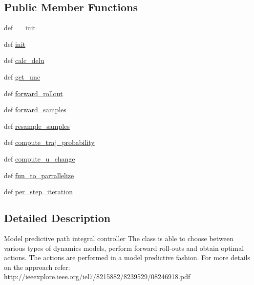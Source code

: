 \subsection*{Public Member Functions}
\begin{DoxyCompactItemize}
\item 
def \hyperlink{classaml__opt_1_1mppi__controller_1_1mppi__controller_1_1_m_p_p_i_controller_ae231c281d2731163b919cfae98526031}{\-\_\-\-\_\-init\-\_\-\-\_\-}
\item 
def \hyperlink{classaml__opt_1_1mppi__controller_1_1mppi__controller_1_1_m_p_p_i_controller_a22e2e4e882b6786cf5a206906d360a5a}{init}
\item 
def \hyperlink{classaml__opt_1_1mppi__controller_1_1mppi__controller_1_1_m_p_p_i_controller_a687ec79baf303a410b469148db9fd44f}{calc\-\_\-delu}
\item 
def \hyperlink{classaml__opt_1_1mppi__controller_1_1mppi__controller_1_1_m_p_p_i_controller_acb1e37b0e70f40de3d7924bc3423e670}{get\-\_\-unc}
\item 
def \hyperlink{classaml__opt_1_1mppi__controller_1_1mppi__controller_1_1_m_p_p_i_controller_a2b55b9ba153afbaa57a8b3785b367011}{forward\-\_\-rollout}
\item 
def \hyperlink{classaml__opt_1_1mppi__controller_1_1mppi__controller_1_1_m_p_p_i_controller_ab291469dfce2398f98b5812f25665f65}{forward\-\_\-samples}
\item 
def \hyperlink{classaml__opt_1_1mppi__controller_1_1mppi__controller_1_1_m_p_p_i_controller_a608122d185b4401ca17eb088c72c1a21}{resample\-\_\-samples}
\item 
def \hyperlink{classaml__opt_1_1mppi__controller_1_1mppi__controller_1_1_m_p_p_i_controller_aecd5cdce0c5364fbcf6ed890b3b1933e}{compute\-\_\-traj\-\_\-probability}
\item 
def \hyperlink{classaml__opt_1_1mppi__controller_1_1mppi__controller_1_1_m_p_p_i_controller_a213f5b0756b132c4e4253baa199cb061}{compute\-\_\-u\-\_\-change}
\item 
def \hyperlink{classaml__opt_1_1mppi__controller_1_1mppi__controller_1_1_m_p_p_i_controller_a689adb7d7d0e10cf9b40b52733c81c5b}{fun\-\_\-to\-\_\-parrallelize}
\item 
def \hyperlink{classaml__opt_1_1mppi__controller_1_1mppi__controller_1_1_m_p_p_i_controller_a04416a629f547bb3a888b479169afda9}{per\-\_\-step\-\_\-iteration}
\end{DoxyCompactItemize}


\subsection{Detailed Description}
\begin{DoxyVerb}Model predictive path integral controller
The class is able to choose between various types of dynamics models,
perform forward roll-outs and obtain optimal actions.
The actions are performed in a model predictive fashion.
For more details on the approach refer: http://ieeexplore.ieee.org/iel7/8215882/8239529/08246918.pdf
\end{DoxyVerb}
 

